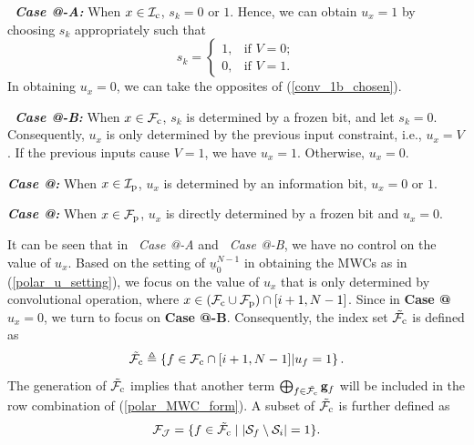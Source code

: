 \documentclass[12pt, draftclsnofoot, peerreview, onecolumn]{IEEEtran}
\makeatletter
\theoremstyle{noparent}
\newcommand{\Rmnum}[1]{\expandafter\@slowromancap\romannumeral #1@}
\makeatother
\begin{document}
\textbf{\textit{\ Case \Rmnum{1}-A:}} When $x\in \mathcal{I}_{\rm c}$, $s_{k}=0$ or $1$.
Hence, we can obtain $u_x=1$ by choosing
$s_{k}$ appropriately such that 
\begin{equation}
    \label{conv_1b_chosen}
    s_{k}=
    \left\{
    \begin{array}{ll}
    1, & \text {if } V=0;\\
    0, & \text {if } V=1.
    \end{array}
    \right.
\end{equation}
In obtaining $u_x=0$, we can take the opposites of (\ref{conv_1b_chosen}).

\textbf{\textit{\ Case \Rmnum{1}-B:}} When $x\in \mathcal{F}_{\rm c}$, $s_{k}$ is 
determined by a frozen bit,
and let $s_{k}=0$.
Consequently, $u_x$ is only determined by
the previous input constraint, 
i.e., $u_x=V$.
If the previous inputs cause $V=1$, we have $u_x=1$.
Otherwise, $u_x=0$.

\textbf{\textit{Case \Rmnum{2}:}} When $x\in \mathcal{I}_{\rm p}$, 
$u_x$ is determined by an information bit,
$u_x=0$ or $1$.

\textbf{\textit{Case \Rmnum{3}:}} When $x\in \mathcal{F}_{\rm p}$,
$u_x$ is directly determined by a frozen bit and $u_x=0$.

It can be seen that in \textit{\ Case \Rmnum{1}-A} and \textit{\ Case \Rmnum{1}-B}, we have no control on the 
value of $u_x$.
Based on the setting of $\underline{u}_{0}^{N-1}$ in obtaining the MWCs as
in (\ref{polar_u_setting}), we focus on the value of $u_x$
that is only determined by convolutional operation, where $x\in (\mathcal{F}_{\rm c}\cup\mathcal{F}_{\rm p})\cap[i+1, N-1]$.
Since in \textbf{Case \Rmnum{3}} $u_x=0$,
we turn to focus on \textbf{Case \Rmnum{1}-B}.
Consequently, the index set $\tilde{\mathcal{F}_{\rm c}}$ is defined as 
\begin{equation}
    \label{F_c_piao}
\tilde{\mathcal{F}_{\rm c}}  \triangleq \left\{f \in \mathcal{F}_{\rm c} \cap [i+1, N-1] | u_f=1\right\}.
\end{equation}
The generation of $\tilde{\mathcal{F}_{\rm c}}$ implies that 
another term $\bigoplus_{f \in \tilde{\mathcal{F}_{\rm c}}} \mathbf{g}_f$ 
will be included in the row combination of (\ref{polar_MWC_form}).
A subset of $\tilde{\mathcal{F}_{\rm c}}$ 
is further defined as
\begin{equation}
\label{F_J}
\mathcal{F}_{\mathcal{J}}=\{f \in \tilde{\mathcal{F}_{\rm c}}  \mid  \left|\mathcal{S}_f \setminus \mathcal{S}_i\right|=1 \}.
\end{equation}
\end{document}
